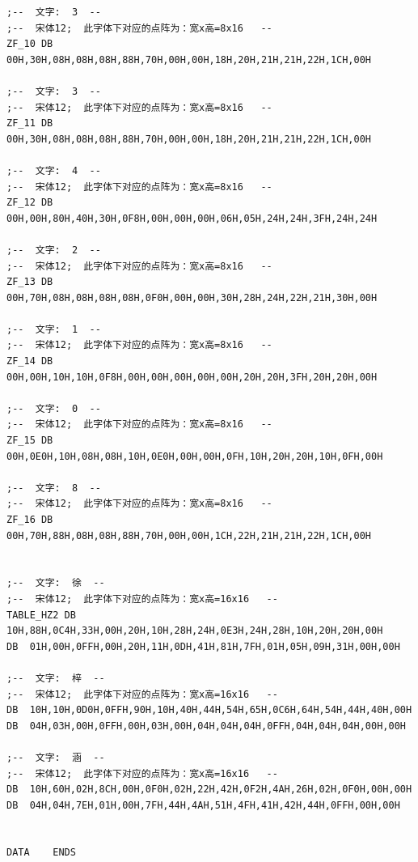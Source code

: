 \documentclass[UTF8]{article}
\begin{document}
\begin{lstlisting}[language={[x86masm]Assembler}]
;--  文字:  3  --
;--  宋体12;  此字体下对应的点阵为：宽x高=8x16   --
ZF_10 DB  00H,30H,08H,08H,08H,88H,70H,00H,00H,18H,20H,21H,21H,22H,1CH,00H
 
;--  文字:  3  --
;--  宋体12;  此字体下对应的点阵为：宽x高=8x16   --
ZF_11 DB  00H,30H,08H,08H,08H,88H,70H,00H,00H,18H,20H,21H,21H,22H,1CH,00H
 
;--  文字:  4  --
;--  宋体12;  此字体下对应的点阵为：宽x高=8x16   --
ZF_12 DB  00H,00H,80H,40H,30H,0F8H,00H,00H,00H,06H,05H,24H,24H,3FH,24H,24H
 
;--  文字:  2  --
;--  宋体12;  此字体下对应的点阵为：宽x高=8x16   --
ZF_13 DB  00H,70H,08H,08H,08H,08H,0F0H,00H,00H,30H,28H,24H,22H,21H,30H,00H
 
;--  文字:  1  --
;--  宋体12;  此字体下对应的点阵为：宽x高=8x16   --
ZF_14 DB  00H,00H,10H,10H,0F8H,00H,00H,00H,00H,00H,20H,20H,3FH,20H,20H,00H
 
;--  文字:  0  --
;--  宋体12;  此字体下对应的点阵为：宽x高=8x16   --
ZF_15 DB  00H,0E0H,10H,08H,08H,10H,0E0H,00H,00H,0FH,10H,20H,20H,10H,0FH,00H
 
;--  文字:  8  --
;--  宋体12;  此字体下对应的点阵为：宽x高=8x16   --
ZF_16 DB  00H,70H,88H,08H,08H,88H,70H,00H,00H,1CH,22H,21H,21H,22H,1CH,00H
 
 
;--  文字:  徐  --
;--  宋体12;  此字体下对应的点阵为：宽x高=16x16   --
TABLE_HZ2 DB  10H,88H,0C4H,33H,00H,20H,10H,28H,24H,0E3H,24H,28H,10H,20H,20H,00H
DB  01H,00H,0FFH,00H,20H,11H,0DH,41H,81H,7FH,01H,05H,09H,31H,00H,00H
 
;--  文字:  梓  --
;--  宋体12;  此字体下对应的点阵为：宽x高=16x16   --
DB  10H,10H,0D0H,0FFH,90H,10H,40H,44H,54H,65H,0C6H,64H,54H,44H,40H,00H
DB  04H,03H,00H,0FFH,00H,03H,00H,04H,04H,04H,0FFH,04H,04H,04H,00H,00H
 
;--  文字:  涵  --
;--  宋体12;  此字体下对应的点阵为：宽x高=16x16   --
DB  10H,60H,02H,8CH,00H,0F0H,02H,22H,42H,0F2H,4AH,26H,02H,0F0H,00H,00H
DB  04H,04H,7EH,01H,00H,7FH,44H,4AH,51H,4FH,41H,42H,44H,0FFH,00H,00H
 
 
DATA    ENDS
\end{lstlisting}
\end{document}

